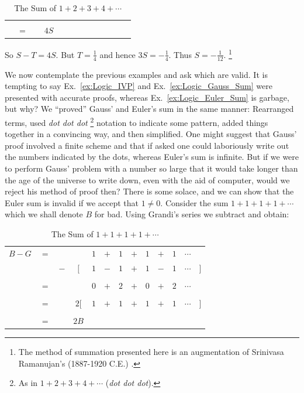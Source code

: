 \begin{example}
\begin{table}[H]
\begin{tabular}{ccccccccccccc}
                    \\[1ex]
                \hline\\
                &$=$&&$4S$
            \end{tabular}
            \caption{The Sum of $1+2+3+4+\cdots$}
        \end{table}
        So $S-T=4S$. But $T=\frac{1}{4}$ and hence $3S=\minus\frac{1}{4}$.
        Thus $S=\minus\frac{1}{12}$.%
        \footnote{%
            The method of summation presented here is an augmentation of
            Srinivasa Ramanujan's (1887-1920 C.E.)
            \cite[Chapt.~VIII p.~3]{RamanujanNotebooksI}.
        }
    \end{example}
    We now contemplate the previous examples and ask which are valid. It is
    tempting to say Ex.~\ref{ex:Logic_IVP} and Ex.~\ref{ex:Logic_Gauss_Sum} were
    presented with accurate proofs, whereas Ex.~\ref{ex:Logic_Euler_Sum} is
    garbage, but why? We ``proved'' Gauss' and Euler's sum in the same manner:
    Rearranged terms, used \textit{dot dot dot}%
    \footnote{
        As in $1+2+3+4+\cdots$ (\textit{dot dot dot}).
    }
    notation to indicate some pattern, added things together in a convincing
    way, and then simplified. One might suggest that Gauss' proof involved a
    finite scheme and that if asked one could laboriously write out the numbers
    indicated by the dots, whereas Euler's sum is infinite. But if we were to
    perform Gauss' problem with a number so large that it would take longer than
    the age of the universe to write down, even with the aid of computer, would
    we reject his method of proof then? There is some solace, and we can show
    that the Euler sum is invalid if we accept that $1\ne{0}$. Consider the sum
    $1+1+1+1+\cdots$ which we shall denote $B$ for bad. Using Grandi's series we
    subtract and obtain:
    \begin{table}[H]
        \centering
        \captionsetup{type=table}
        \begin{tabular}{ccccccccccccc}
            $B-G$&$=$&&       &$1$&$+$&$1$&$+$&$1$&$+$&$1$&$\cdots$\\
                 &&$-$&$\Big[$&$1$&$-$&$1$&$+$&$1$&$-$&$1$&$\cdots$&$\Big]$
            \\[1ex]
            \hline\\
                 &$=$&&&$0$&$+$&$2$&$+$&$0$&$+$&$2$&$\cdots$\\[1ex]
            \hline\\
            &$=$&&$2\Big[$&$1$&$+$&$1$&$+$&$1$&$+$&$1$&$\cdots$&$\Big]$
                \\[1ex]
            \hline\\
            &$=$&&$2B$
        \end{tabular}
        \caption{The Sum of $1+1+1+1+\cdots$}
    \end{table}
